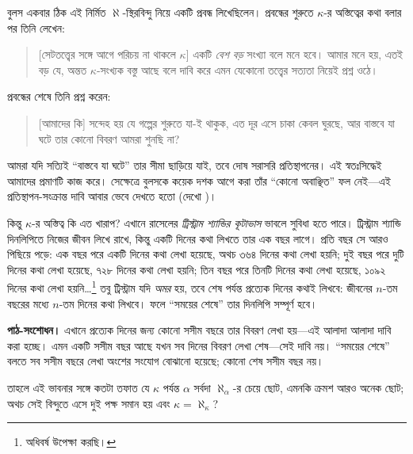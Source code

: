 \documentclass[../../../include/open-logic-section]{subfiles}
\begin{document}
বুলস একবার ঠিক এই নির্মিত $\aleph$-স্থিরবিন্দু
নিয়ে একটি প্রবন্ধ লিখেছিলেন। প্রবন্ধের শুরুতে
$\kappa$-র অস্তিত্বের কথা বলার পর তিনি লেখেন:
\begin{quote}
	[সেটতত্ত্বের সঙ্গে আগে পরিচয় না থাকলে $\kappa$]
	একটি \emph{বেশ বড়} সংখ্যা বলে মনে হবে। আমার
	মনে হয়, এতই বড় যে, অন্তত $\kappa$-সংখ্যক বস্তু
	আছে বলে দাবি করে এমন যেকোনো তত্ত্বের সত্যতা
	নিয়েই প্রশ্ন ওঠে।
	\citep[p.~257]{Boolos2000}
\end{quote}
প্রবন্ধের শেষে তিনি প্রশ্ন করেন:
\begin{quote}
	[আমাদের কি] সন্দেহ হয় যে গল্পের শুরুতে যা-ই
	থাকুক, এত দূর এসে চাকা কেবল ঘুরছে, আর বাস্তবে
	যা ঘটে তার কোনো বিবরণ আমরা শুনছি না?
	\citep[p.~268]{Boolos2000}
\end{quote}
আমরা যদি সত্যিই ``বাস্তবে যা ঘটে'' তার সীমা
ছাড়িয়ে যাই, তবে দোষ সরাসরি প্রতিস্থাপনের।
এই স্বতঃসিদ্ধেই আমাদের প্রমাণটি কাজ করে।
সেক্ষেত্রে বুলসকে কয়েক দশক আগে করা তাঁর
``কোনো অবাঞ্ছিত'' ফল নেই—এই প্রতিস্থাপন-সংক্রান্ত
দাবি আবার ভেবে দেখতে হতো
(দেখো )।

কিন্তু $\kappa$-র অস্তিত্ব কি এত খারাপ? এখানে
রাসেলের \emph{ট্রিস্ট্রাম শ্যান্ডির কূটাভাস}
ভাবলে সুবিধা হতে পারে। ট্রিস্ট্রাম শ্যান্ডি
দিনলিপিতে নিজের জীবন লিখে রাখে, কিন্তু একটি
দিনের কথা লিখতে তার এক বছর লাগে। প্রতি বছর
সে আরও পিছিয়ে পড়ে: এক বছর পরে একটি দিনের
কথা লেখা হয়েছে, অথচ ৩৬৪ দিনের কথা লেখা
হয়নি; দুই বছর পরে দুটি দিনের কথা লেখা হয়েছে,
৭২৮ দিনের কথা লেখা হয়নি; তিন বছর পরে
তিনটি দিনের কথা লেখা হয়েছে, ১০৯২ দিনের
কথা লেখা হয়নি\dots\footnote{অধিবর্ষ উপেক্ষা করছি।}
তবু ট্রিস্ট্রাম যদি \emph{অমর} হয়, তবে শেষ পর্যন্ত
প্রত্যেক দিনের কথাই লিখবে: জীবনের $n$-তম বছরের
মধ্যে $n$-তম দিনের কথা লিখবে। ফলে ``সময়ের শেষে''
তার দিনলিপি সম্পূর্ণ হবে।
\par\noindent\textbf{পাঠ-সংশোধন।} এখানে প্রত্যেক দিনের জন্য কোনো সসীম বছরে তার বিবরণ লেখা
হয়—এই আলাদা আলাদা দাবি করা হচ্ছে। এমন একটি সসীম বছর
আছে যখন সব দিনের বিবরণ লেখা শেষ—সেই দাবি নয়।
``সময়ের শেষে'' বলতে সব সসীম বছরে লেখা অংশের সংযোগ বোঝানো
হয়েছে; কোনো শেষ সসীম বছর নয়।

তাহলে এই ভাবনার সঙ্গে কতটা তফাত যে $\kappa$
পর্যন্ত $\alpha$ সর্বদা $\aleph_\alpha$-র চেয়ে ছোট,
এমনকি ক্রমশ আরও অনেক ছোট; অথচ সেই বিন্দুতে এসে
দুই পক্ষ সমান হয় এবং $\kappa=\aleph_\kappa$?
\end{document}
